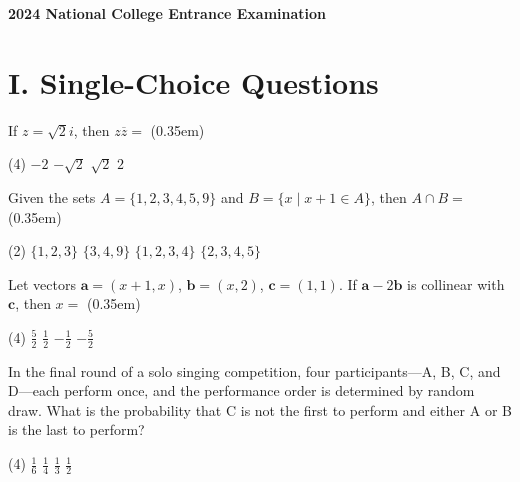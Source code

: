 \documentclass[UTF8,12pt]{ctexart}
\newcommand{\examtitle}{2024 National College Entrance Examination}
\newcommand{\examsubtitle}{National College Entrance Examination}
\newcommand{\makeexamtitle}{%
  \begin{center}
    {\LARGE\bfseries\examtitle}\par
    \vspace{0.4em}{\Large\bfseries\examsubtitle}\par
  \end{center}\vspace{0.4em}}
\begin{document}
\makeexamtitle

\section*{I. Single-Choice Questions}

\begin{questions}

  \item If $z = \sqrt{2}i$, then $z\overline{z} =$ \mbox{(\kern0.35em)}

    \begin{tasks}(4)
      \task $-2$
      \task $-\sqrt{2}$
      \task $\sqrt{2}$
      \task $2$
    \end{tasks}

  \item Given the sets $A = \{1, 2, 3, 4, 5, 9\}$ and $B = \{x \mid x + 1 \in A\}$, then
    $A \cap B =$ \mbox{(\kern0.35em)}

    \begin{tasks}(2)
      \task $\{1, 2, 3\}$
      \task $\{3, 4, 9\}$
      \task $\{1, 2, 3, 4\}$
      \task $\{2, 3, 4, 5\}$
    \end{tasks}

  \item Let vectors $\boldsymbol{a} = (x + 1, x)$, $\boldsymbol{b} = (x, 2)$,
    $\boldsymbol{c} = (1, 1)$. If $\boldsymbol{a} - 2\boldsymbol{b}$ is collinear with
    $\boldsymbol{c}$, then $x =$ \mbox{(\kern0.35em)}

    \begin{tasks}(4)
      \task $\frac{5}{2}$
      \task $\frac{1}{2}$
      \task $-\frac{1}{2}$
      \task $-\frac{5}{2}$
    \end{tasks}

  \item In the final round of a solo singing competition, four participants—A, B, C, and
    D—each perform once, and the performance order is determined by random draw. What is
    the probability that C is not the first to perform and either A or B is the last to
    perform?

    \begin{tasks}(4)
      \task $\frac{1}{6}$
      \task $\frac{1}{4}$
      \task $\frac{1}{3}$
      \task $\frac{1}{2}$
    \end{tasks}


\end{questions}
\end{document}
